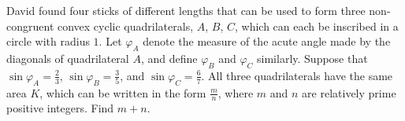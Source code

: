 David found four sticks of different lengths that can be used to form three non-congruent convex cyclic quadrilaterals, \(A\),  \(B\),  \(C\),  which can each be inscribed in a circle with radius \(1\). Let \(\varphi_A\) denote the measure of the acute angle made by the diagonals of quadrilateral \(A\),  and define \(\varphi_B\) and \(\varphi_C\) similarly. Suppose that \(\sin\varphi_A=\frac{2}{3}\),  \(\sin\varphi_B=\frac{3}{5}\),  and \(\sin\varphi_C=\frac{6}{7}\). All three quadrilaterals have the same area \(K\),  which can be written in the form \(\frac{m}{n}\),  where \(m\) and \(n\) are relatively prime positive integers. Find \(m+n\).